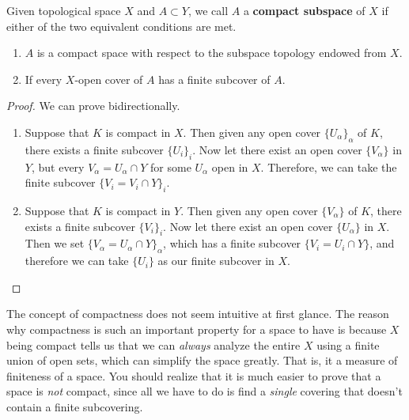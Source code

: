   \begin{definition}
    Given topological space $X$ and $A \subset Y$, we call $A$ a \textbf{compact subspace} of $X$ if either of the two equivalent conditions are met. 
    \begin{enumerate}
      \item $A$ is a compact space with respect to the subspace topology endowed from $X$. 
      \item If every $X$-open cover of $A$ has a finite subcover of $A$. 
    \end{enumerate}
  \end{definition}
  \begin{proof}
    We can prove bidirectionally. 
    \begin{enumerate}
      \item Suppose that $K$ is compact in $X$. Then given any open cover $\{U_\alpha\}_\alpha$ of $K$, there exists a finite subcover $\{U_i\}_{i}$. Now let there exist an open cover $\{V_\alpha\}$ in $Y$, but every $V_\alpha = U_\alpha \cap Y$ for some $U_\alpha$ open in $X$. Therefore, we can take the finite subcover $\{V_i = V_i \cap Y\}_i$. 

      \item Suppose that $K$ is compact in $Y$. Then given any open cover $\{V_\alpha\}$ of $K$, there exists a finite subcover $\{V_i\}_i$. Now let there exist an open cover $\{U_\alpha\}$ in $X$. Then we set $\{V_\alpha = U_\alpha \cap Y\}_\alpha$, which has a finite subcover $\{V_i = U_i \cap Y\}$, and therefore we can take $\{U_i\}$ as our finite subcover in $X$. 
    \end{enumerate}
  \end{proof}
   
  The concept of compactness does not seem intuitive at first glance. The reason why compactness is such an important property for a space to have is because $X$ being compact tells us that we can \textit{always} analyze the entire $X$ using a finite union of open sets, which can simplify the space greatly. That is, it a measure of finiteness of a space. You should realize that it is much easier to prove that a space is \textit{not} compact, since all we have to do is find a \textit{single} covering that doesn't contain a finite subcovering. 

